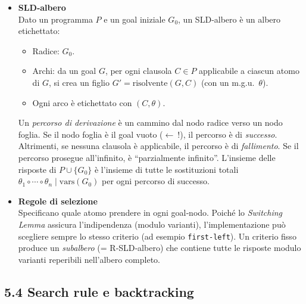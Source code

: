 \documentclass[12pt]{article}
\begin{document}
\begin{itemize}
  \item \textbf{SLD‐albero}\\
    Dato un programma $P$ e un goal iniziale $G_0$, un SLD‐albero è un albero etichettato:
    \begin{itemize}
      \item Radice: $G_0$.
      \item Archi: da un goal $G$, per ogni clausola $C \in P$ applicabile a ciascun atomo di $G$, si crea un figlio $G' = \text{risolvente}(G,C)$ (con un m.g.u.\ \(\theta\)). 
      \item Ogni arco è etichettato con $(C,\theta)$.
    \end{itemize}
    Un \emph{percorso di derivazione} è un cammino dal nodo radice verso un nodo foglia. Se il nodo foglia è il goal vuoto ($\leftarrow\ !$), il percorso è di \emph{successo}. Altrimenti, se nessuna clausola è applicabile, il percorso è di \emph{fallimento}. Se il percorso prosegue all’infinito, è “parzialmente infinito”.
    L’insieme delle risposte di $P \cup \{G_0\}$ è l’insieme di tutte le sostituzioni totali \(\theta_1\circ\cdots\circ\theta_n\mid \mathrm{vars}(G_0)\) per ogni percorso di successo.

  \item \textbf{Regole di selezione}\\
    Specificano quale atomo prendere in ogni goal‐nodo. Poiché lo \emph{Switching Lemma} assicura l’indipendenza (modulo varianti), l’implementazione può scegliere sempre lo stesso criterio (ad esempio \texttt{first‐left}). Un criterio fisso produce un \emph{subalbero} (= R‐SLD‐albero) che contiene tutte le risposte modulo varianti reperibili nell’albero completo.
\end{itemize}

\subsection*{5.4 Search rule e backtracking}
\end{document}
